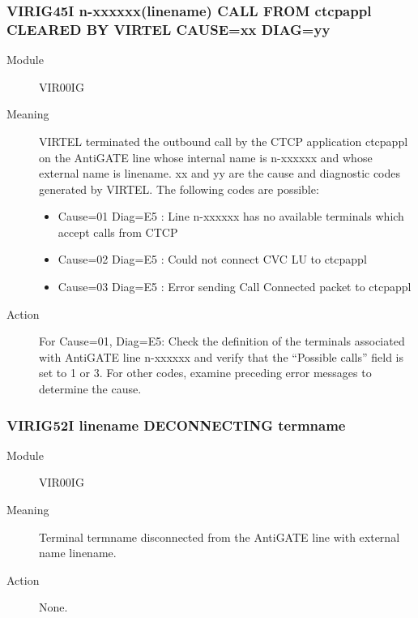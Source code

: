 \documentclass[letterpaper,10pt,english]{sphinxmanual}
\begin{document}
\subsubsection{VIRIG45I n-xxxxxx(linename) CALL FROM ctcpappl CLEARED BY VIRTEL CAUSE=xx DIAG=yy}
\label{\detokenize{messages:virig45i-n-xxxxxx-linename-call-from-ctcpappl-cleared-by-virtel-cause-xx-diag-yy}}\begin{description}
\item[{Module}] \leavevmode
VIR00IG

\item[{Meaning}] \leavevmode
VIRTEL terminated the outbound call by the CTCP application ctcpappl on the AntiGATE line whose internal name is n-xxxxxx and whose external name is linename. xx and yy are the cause and diagnostic codes generated by VIRTEL. The following codes are possible:
\begin{itemize}
\item {} 
Cause=01 Diag=E5 : Line n-xxxxxx has no available terminals which accept calls from CTCP

\item {} 
Cause=02 Diag=E5 : Could not connect CVC LU to ctcpappl

\item {} 
Cause=03 Diag=E5 : Error sending Call Connected packet to ctcpappl

\end{itemize}

\item[{Action}] \leavevmode
For Cause=01, Diag=E5: Check the definition of the terminals associated with AntiGATE line n-xxxxxx and verify that the “Possible calls” field is set to 1 or 3. For other codes, examine preceding error messages to determine the cause.

\end{description}


\subsubsection{VIRIG52I linename DECONNECTING termname}
\label{\detokenize{messages:virig52i-linename-deconnecting-termname}}\begin{description}
\item[{Module}] \leavevmode
VIR00IG

\item[{Meaning}] \leavevmode
Terminal termname disconnected from the AntiGATE line with external name linename.

\item[{Action}] \leavevmode
None.

\end{description}
\end{document}
